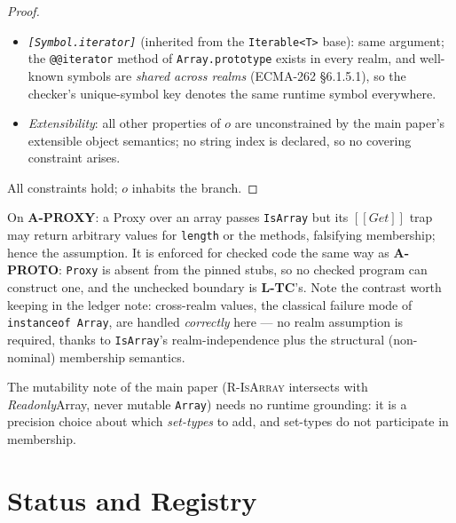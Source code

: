 \documentclass[11pt]{article}
\newcommand{\ecma}[1]{ECMA-262 \S#1}
\newcommand{\intm}[1]{[[#1]]}
\begin{document}
\begin{proof}
\begin{itemize}
  Every listed name is a function-valued property of
  \texttt{Array.prototype} in every realm (\ecma{23.1.3}), reached by
  $\mathsf{get}$ through the instance's prototype chain; arrays from
  other realms find their own realm's identical-by-spec
  \texttt{Array.prototype}. (An own property shadowing a method with a
  non-callable value would falsify this — that is ordinary property
  mutation, covered by \textbf{L-MUT}/\textbf{L-PURE} snapshots like
  every other field statement, not a new caveat.)
\item \emph{\texttt{[Symbol.iterator]}} (inherited from the
  \texttt{Iterable<T>} base): same argument; the \texttt{@@iterator}
  method of \texttt{Array.prototype} exists in every realm, and
  well-known symbols are \emph{shared across realms}
  (\ecma{6.1.5.1}), so the checker's unique-symbol key denotes the same
  runtime symbol everywhere.
\item \emph{Extensibility}: all other properties of $o$ are
  unconstrained by the main paper's extensible object semantics; no
  string index is declared, so no covering constraint arises.
\end{itemize}
All constraints hold; $o$ inhabits the branch.
\end{proof}

On \textbf{A-PROXY}: a Proxy over an array passes \texttt{IsArray} but
its $\intm{Get}$ trap may return arbitrary values for \texttt{length} or
the methods, falsifying membership; hence the assumption. It is enforced
for checked code the same way as \textbf{A-PROTO}: \texttt{Proxy} is
absent from the pinned stubs, so no checked program can construct one,
and the unchecked boundary is \textbf{L-TC}'s. Note the contrast worth
keeping in the ledger note: cross-realm values, the classical failure
mode of \texttt{instanceof Array}, are handled \emph{correctly} here —
no realm assumption is required, thanks to \texttt{IsArray}'s
realm-independence plus the structural (non-nominal) membership
semantics.

The mutability note of the main paper (\textsc{R-IsArray} intersects
with \emph{Readonly}Array, never mutable \texttt{Array}) needs no
runtime grounding: it is a precision choice about which \emph{set-types}
to add, and set-types do not participate in membership.

\section{Status and Registry}
\label{sec:status}
\end{document}
